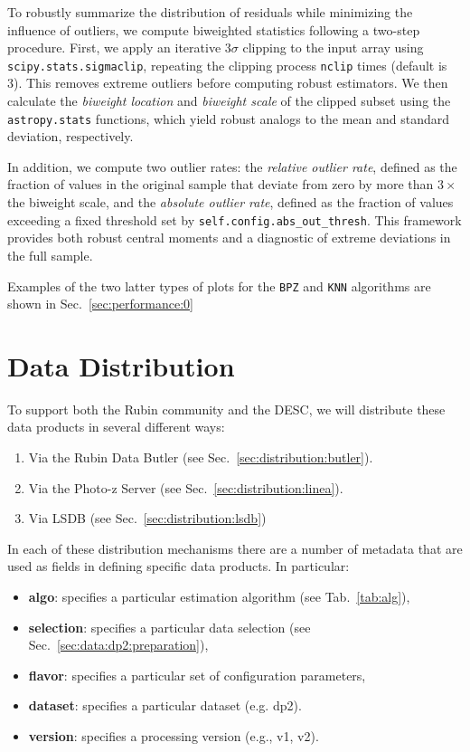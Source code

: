 To robustly summarize the distribution of residuals while minimizing the influence of outliers, we compute biweighted statistics following a two-step procedure. First, we apply an iterative $3\sigma$ clipping to the input array using \texttt{scipy.stats.sigmaclip}, repeating the clipping process \texttt{nclip} times (default is 3). This removes extreme outliers before computing robust estimators. We then calculate the \textit{biweight location} and \textit{biweight scale} of the clipped subset using the \texttt{astropy.stats} functions, which yield robust analogs to the mean and standard deviation, respectively.

In addition, we compute two outlier rates: the \textit{relative outlier rate}, defined as the fraction of values in the original sample that deviate from zero by more than $3\times$ the biweight scale, and the \textit{absolute outlier rate}, defined as the fraction of values exceeding a fixed threshold set by \texttt{self.config.abs\_out\_thresh}. This framework provides both robust central moments and a diagnostic of extreme deviations in the full sample.

Examples of the two latter types of plots for the \texttt{BPZ} and \texttt{KNN} algorithms are shown in Sec.~\ref{sec:performance:0}



\section{Data Distribution}
\label{sec:distribution:0}

To support both the Rubin community and the DESC, we will distribute these data products in several different ways:
\begin{enumerate}
\item{Via the Rubin Data Butler (see Sec.~\ref{sec:distribution:butler}).}
\item{Via the Photo-z Server (see Sec.~\ref{sec:distribution:linea}).}
\item{Via LSDB (see Sec.~\ref{sec:distribution:lsdb})}
\end{enumerate}

In each of these distribution mechanisms there are a number of metadata that are used as fields in defining specific data products.  In particular:

\begin{itemize}
\item{\textbf{algo}: specifies a particular \photoz estimation algorithm (see Tab.~\ref{tab:alg}),}
\item{\textbf{selection}: specifies a particular data selection (see Sec.~\ref{sec:data:dp2:preparation}),}
\item{\textbf{flavor}: specifies a particular set of configuration parameters,}
\item{\textbf{dataset}: specifies a particular dataset (e.g. dp2).}
\item{\textbf{version}: specifies a processing version (e.g., v1, v2).}
\end{itemize}


